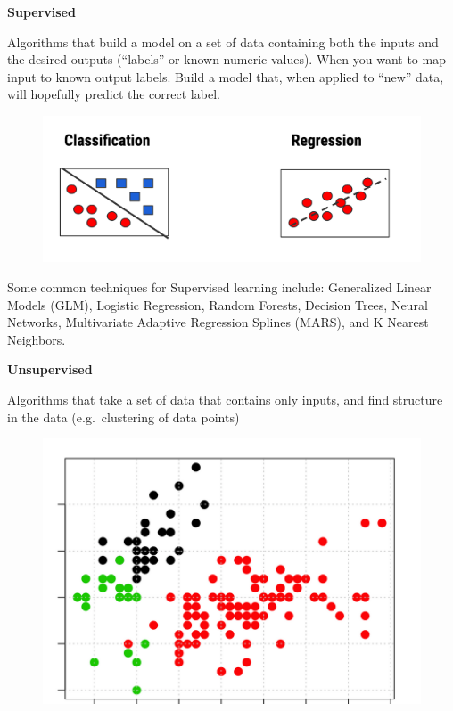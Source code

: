 \documentclass[]{book}
\begin{document}
\textbf{Supervised}

Algorithms that build a model on a set of data containing both the
inputs and the desired outputs (``labels'' or known numeric values).
When you want to map input to known output labels. Build a model that,
when applied to ``new'' data, will hopefully predict the correct label.

\begin{figure}
\centering
\includegraphics{./PICS/super_class_regress.png}
\caption{}
\end{figure}

Some common techniques for Supervised learning include: Generalized
Linear Models (GLM), Logistic Regression, Random Forests, Decision
Trees, Neural Networks, Multivariate Adaptive Regression Splines (MARS),
and K Nearest Neighbors.

\textbf{Unsupervised}

Algorithms that take a set of data that contains only inputs, and find
structure in the data (e.g.~clustering of data points)

\begin{figure}
\centering
\includegraphics[width=5.20833in]{./PICS/unsupervised_class.png}
\caption{}
\end{figure}
\end{document}
